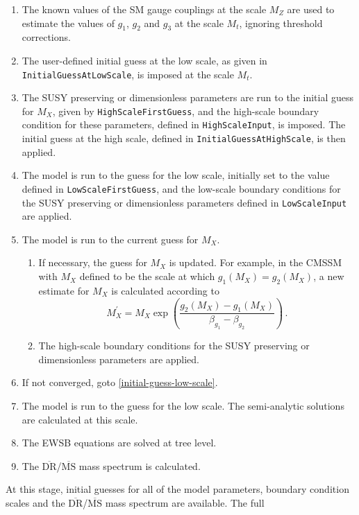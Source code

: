 \documentclass[final,3p,11pt,pdflatex]{elsarticle}
\newcommand{\code}[1]{\lstinline|#1|}  %
\newcommand{\ol}[1]{\overline{#1}}
\newcommand{\MSbar}{\ensuremath{\ol{\text{MS}}}\xspace}
\newcommand{\DRbar}{\ensuremath{\ol{\text{DR}}}\xspace}
\begin{document}
\begin{enumerate}
\item The known values of the SM gauge couplings at the scale $M_Z$ are
  used to estimate the values of $g_1$, $g_2$ and $g_3$ at the scale
  $M_t$, ignoring threshold corrections.
\item The user-defined initial guess at the low scale, as given in
  \code{InitialGuessAtLowScale}, is imposed at the scale $M_t$.
\item The SUSY preserving or dimensionless parameters are run to the initial
  guess for $M_X$, given by \code{HighScaleFirstGuess}, and the
  high-scale boundary condition for these parameters, defined in
  \code{HighScaleInput}, is imposed.  The initial guess at the high scale,
  defined in \code{InitialGuessAtHighScale}, is then applied.
\item \label{initial-guess-low-scale} The model is run to the guess for the
  low scale, initially set to the value defined in \code{LowScaleFirstGuess},
  and the low-scale boundary conditions for the SUSY preserving or
  dimensionless parameters defined in \code{LowScaleInput} are applied.
\item The model is run to the current guess for $M_X$.
  \begin{enumerate}
  \item If necessary, the guess for $M_X$ is updated.  For example, in
    the CMSSM with $M_X$ defined to be the scale at which $g_1(M_X) = g_2(M_X)$,
    a new estimate for $M_X$ is calculated according to
    \begin{equation*}
      M_X^\prime = M_X \exp\left( \frac{g_2(M_X)-g_1(M_X)}
      {\beta_{g_1} - \beta_{g_2}} \right ) \, .
    \end{equation*}
  \item The high-scale boundary conditions for the SUSY preserving or
    dimensionless parameters are applied.
  \end{enumerate}
\item If not converged, goto \ref{initial-guess-low-scale}.
\item The model is run to the guess for the low scale.  The semi-analytic
  solutions are calculated at this scale.
\item The EWSB equations are solved at tree level.
\item The \DRbar/\MSbar mass spectrum is calculated.
\end{enumerate}
%
At this stage, initial guesses for all of the model parameters, boundary
condition scales and the \DRbar/\MSbar mass spectrum are available.  The full
\end{document}
